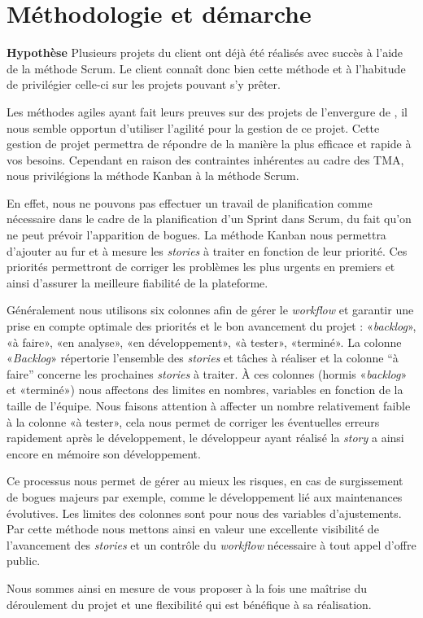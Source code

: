 \section{Méthodologie et démarche}
\begin{exemple}
\textbf{Hypothèse} Plusieurs projets du client ont déjà été réalisés avec succès à l’aide de la méthode Scrum. Le client connaît donc bien cette méthode et à l’habitude de privilégier celle-ci sur les projets pouvant s’y prêter.
\end{exemple}

Les méthodes agiles ayant fait leurs preuves sur des projets de l’envergure de \correlyce{}, il nous semble opportun d’utiliser l’agilité pour la gestion de ce projet. Cette gestion de projet permettra de répondre de la manière la plus efficace et rapide à vos besoins. Cependant en raison des contraintes inhérentes au cadre des TMA, nous privilégions la méthode Kanban à la méthode Scrum. 

En effet, nous ne pouvons pas effectuer un travail de planification comme nécessaire dans le cadre de la planification d’un Sprint dans Scrum, du fait qu’on ne peut prévoir l’apparition de bogues. La méthode Kanban nous permettra d’ajouter au fur et à mesure les \textit{stories} à traiter en fonction de leur priorité. Ces priorités permettront de corriger les problèmes les plus urgents en premiers et ainsi d’assurer la meilleure fiabilité de la plateforme.

Généralement nous utilisons six colonnes afin de gérer le \textit{workflow} et garantir une prise en compte optimale des priorités et le bon avancement du projet : «\textit{backlog}», «à faire», «en analyse», «en développement», «à tester», «terminé». 
La colonne «\textit{Backlog}» répertorie l’ensemble des \textit{stories} et tâches à réaliser et la colonne “à faire” concerne les prochaines \textit{stories} à traiter. 
À ces colonnes (hormis «\textit{backlog}» et «terminé») nous affectons des limites en nombres, variables en fonction de la taille de l’équipe. Nous faisons attention à affecter un nombre relativement faible à la colonne «à tester», cela nous permet de corriger les éventuelles erreurs rapidement après le développement, le développeur ayant réalisé la \textit{story} a ainsi encore en mémoire son développement. 

Ce processus nous permet de gérer au mieux les risques, en cas de surgissement de bogues majeurs par exemple, comme le développement lié aux maintenances évolutives. Les limites des colonnes sont pour nous des variables d’ajustements. Par cette méthode nous mettons ainsi en valeur une excellente visibilité de l’avancement des \textit{stories} et un contrôle du \textit{workflow} nécessaire à tout appel d’offre public. 

Nous sommes ainsi en mesure de vous proposer à la fois une maîtrise du déroulement du projet et une flexibilité qui est bénéfique à sa réalisation. 

